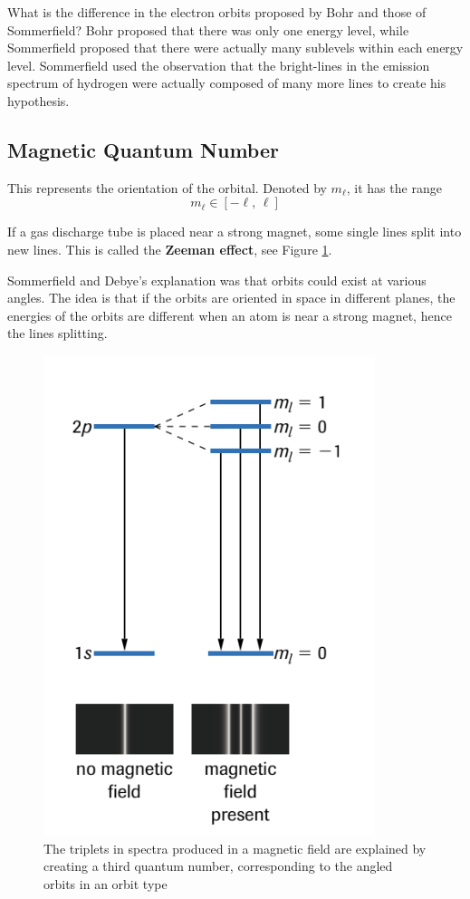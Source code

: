 \begin{sample}{What is the difference in the electron orbits proposed by Bohr and those of
    Sommerfield?}
    Bohr proposed that there was only one energy level, while Sommerfield proposed that there
    were actually many sublevels within each energy level. Sommerfield used the observation that
    the bright-lines in the emission spectrum of hydrogen were actually composed of many more
    lines to create his hypothesis.
\end{sample}

\subsection{Magnetic Quantum Number}
This represents the orientation of the orbital. Denoted
by $m_\ell$, it has the range
\[
    m_\ell\in[-\ell,\,\ell]
\]
\begin{bulleted-list}
    \item If a gas discharge tube is placed near a strong magnet, some single lines split into
        new lines. This is called the \textbf{Zeeman effect}, see Figure \ref{fig:zeeman-effect}.
    \item Sommerfield and Debye's explanation was that orbits could exist at various angles. The
        idea is that if the orbits are oriented in space in different planes, the energies of
        the orbits are different when an atom is near a strong magnet, hence the lines splitting.
\end{bulleted-list}

\begin{figure}[ht!]
    \centering
    \includegraphics[width=0.4 \textwidth]{../figures/zeeman-effect.png}
    \caption{The triplets in spectra produced in a magnetic field are explained by creating a third
        quantum number, corresponding to the angled orbits in an orbit type}
    \label{fig:zeeman-effect}
\end{figure}

